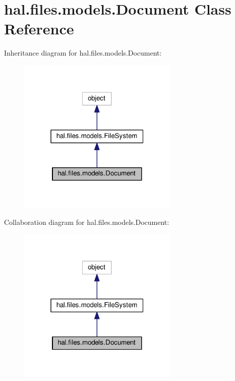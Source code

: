\hypertarget{classhal_1_1files_1_1models_1_1_document}{}\section{hal.\+files.\+models.\+Document Class Reference}
\label{classhal_1_1files_1_1models_1_1_document}


Inheritance diagram for hal.\+files.\+models.\+Document\+:
\nopagebreak
\begin{figure}[H]
\begin{center}
\leavevmode
\includegraphics[width=217pt]{classhal_1_1files_1_1models_1_1_document__inherit__graph}
\end{center}
\end{figure}


Collaboration diagram for hal.\+files.\+models.\+Document\+:
\nopagebreak
\begin{figure}[H]
\begin{center}
\leavevmode
\includegraphics[width=217pt]{classhal_1_1files_1_1models_1_1_document__coll__graph}
\end{center}
\end{figure}
